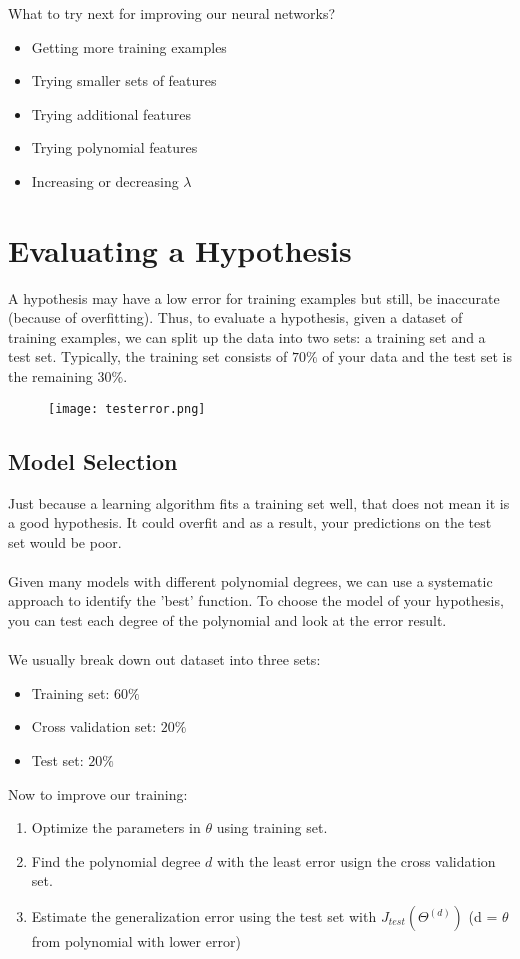 What to try next for improving our neural networks?
\begin{itemize}
  \item Getting more training examples
  \item Trying smaller sets of features
  \item Trying additional features
  \item Trying polynomial features
  \item Increasing or decreasing $\lambda$
\end{itemize}

\section{Evaluating a Hypothesis}
A hypothesis may have a low error for training examples but still, be inaccurate (because of overfitting). Thus, to evaluate a hypothesis, given a dataset of training examples, we can split up the data into two sets: a training set and a test set. Typically, the training set consists of $70\%$ of your data and the test set is the remaining $30\% $.

\begin{figure}[h]
  \texttt{[image: testerror.png]}
\end{figure}

\subsection{Model Selection}
  Just because a learning algorithm fits a training set well, that does not mean it is a good hypothesis. It could overfit and as a result, your predictions on the test set would be poor.
  \\\\
  Given many models with different polynomial degrees, we can use a systematic approach to identify the 'best' function. To choose the model of your hypothesis, you can test each degree of the polynomial and look at the error result.
  \\\\
  We usually break down out dataset into three sets:
  \begin{itemize}
    \item Training set: $60\%$
    \item Cross validation set: $20\%$
    \item Test set: $20\%$
  \end{itemize}


  Now to improve our training:
  \begin{enumerate}
    \item Optimize the parameters in $\theta$ using training set.
    \item Find the polynomial degree $d$ with the least error usign the cross validation set.
    \item Estimate the generalization error using the test set with $J_{test}(\Theta^{(d)})$ (d = $\theta$ from polynomial with lower error)
  \end{enumerate}

